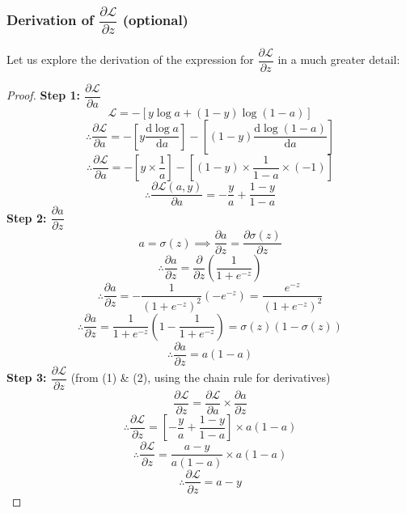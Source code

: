 \documentclass{article}[a4paper,12pt]
\theoremstyle{definition}
\newcommand{\Lagr}{\mathcal{L}}
\begin{document}
\subsubsection{Derivation of $\dfrac{\partial\Lagr}{\partial z}$ (optional)}
Let us explore the derivation of the expression for $\dfrac{\partial \Lagr}{\partial z}$ in a much greater detail:
\begin{proof}
\textbf{Step 1: $\dfrac{\partial \Lagr}{\partial a}$}
$$\Lagr = -[y\log a+(1-y)\log(1-a)]$$
$$\therefore\dfrac{\partial\Lagr}{\partial a}=-\left[y\frac{\text{d}\log a}{\text{d}a}\right]-\left[(1-y)\frac{\text{d}\log(1-a)}{\text{d}a}\right]$$
$$\therefore\dfrac{\partial\Lagr}{\partial a}=-\left[y\times\frac{1}{a}\right]-\left[(1-y)\times\frac{1}{1-a}\times (-1)\right]$$
\begin{equation}\boxed{\therefore\dfrac{\partial\Lagr(a,y)}{\partial a}=-\dfrac{y}{a}+\dfrac{1-y}{1-a}}\end{equation}
\textbf{Step 2: $\dfrac{\partial a}{\partial z}$}
$$a=\sigma(z)\implies\dfrac{\partial a}{\partial z}=\dfrac{\partial \sigma(z)}{\partial z}$$
$$\therefore\dfrac{\partial a}{\partial z}=\dfrac{\partial}{\partial z}\left(\frac{1}{1+e^{-z}}\right)$$
$$\therefore\dfrac{\partial a}{\partial z}=-\frac{1}{(1+e^{-z})^2}(-e^{-z})=\frac{e^{-z}}{(1+e^{-z})^2}$$
$$\therefore\dfrac{\partial a}{\partial z}=\frac{1}{1+e^{-z}}\left(1-\frac{1}{1+e^{-z}}\right)=\sigma(z)(1-\sigma(z))$$
\begin{equation}
\boxed{\therefore\dfrac{\partial a}{\partial z}=a(1-a)}
\end{equation}
\textbf{Step 3: $\dfrac{\partial \Lagr}{\partial z}$} (from (1) \& (2), using the chain rule for derivatives)
$$\frac{\partial \Lagr}{\partial z}=\frac{\partial \Lagr}{\partial a}\times\frac{\partial a}{\partial z}$$
$$\therefore\frac{\partial\Lagr}{\partial z}=\left[-\dfrac{y}{a}+\dfrac{1-y}{1-a}\right]\times a(1-a)$$
$$\therefore\frac{\partial\Lagr}{\partial z}=\frac{a-y}{a(1-a)}\times a(1-a)$$
$$\boxed{\therefore\frac{\partial\Lagr}{\partial z}=a-y}$$
\end{proof}
\end{document}
